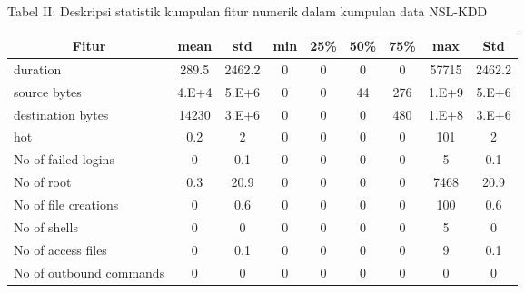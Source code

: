 \documentclass[conference]{IEEEtran}
\begin{document}
\vspace{6px}
\begin{strip}
    \begin{center}
        \small Tabel II: Deskripsi statistik kumpulan fitur numerik dalam kumpulan data NSL-KDD\\
        \vspace{10px}
        \begin{tabular}{l|c|c|c|c|c|c|c|c}
            \hline
            \multicolumn{1}{c|}{\small \textbf{Fitur}}&\multicolumn{1}{c|}{\small \textbf{mean}}&\multicolumn{1}{c|}{\small \textbf{std}}&\multicolumn{1}{c|}{\small \textbf{min}}&\multicolumn{1}{c|}{\small \textbf{25\%}}&\multicolumn{1}{c|}{\small \textbf{50\%}}&\multicolumn{1}{c|}{\small \textbf{75\%}}&\multicolumn{1}{c|}{\small \textbf{max}}&\multicolumn{1}{c}{\small \textbf{Std}} \\
            \hline
            \small duration& \small 289.5& \small 2462.2& \small 0& \small 0& \small 0& \small 0& \small 57715& \small 2462.2\\
            \hline
            \small source bytes& \small 4.E+4& \small 5.E+6& \small 0& \small 0& \small 44& \small 276& \small 1.E+9& \small 5.E+6\\
            \hline
            \small destination bytes& \small 14230& \small 3.E+6& \small 0& \small 0& \small 0& \small 480& \small 1.E+8& \small 3.E+6\\
            \hline
            \small hot& \small 0.2& \small 2& \small 0& \small 0& \small 0& \small 0& \small 101& \small 2\\
            \hline
            \small No of failed logins& \small 0& \small 0.1& \small 0& \small 0& \small 0& \small 0& \small 5& \small 0.1\\
            \hline
            \small No of root& \small 0.3& \small 20.9& \small 0& \small 0& \small 0& \small 0& \small 7468& \small 20.9\\
            \hline
            \small No of file creations& \small 0& \small 0.6& \small 0& \small 0& \small 0& \small 0& \small 100& \small 0.6\\
            \hline
            \small No of shells& \small 0& \small 0& \small 0& \small 0& \small 0& \small 0& \small 5& \small 0\\
            \hline
            \small No of access files& \small 0& \small 0.1& \small 0& \small 0& \small 0& \small 0& \small 9& \small 0.1\\
            \hline
            \small No of outbound commands& \small 0& \small 0& \small 0& \small 0& \small 0& \small 0& \small 0& \small 0\\

\end{tabular}
\end{center}
\end{strip}
\end{document}
